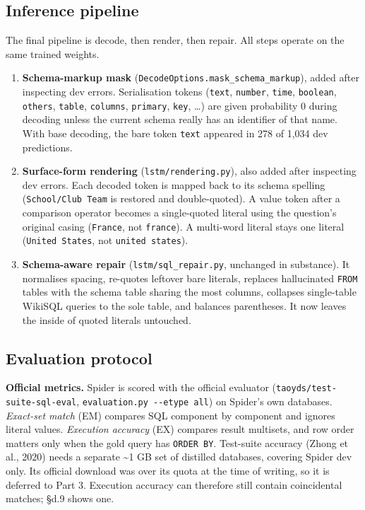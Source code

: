 \documentclass[
  10pt,
]{article}
\providecommand{\tightlist}{%
  \setlength{\itemsep}{0pt}\setlength{\parskip}{0pt}}
\begin{document}
\subsection{Inference pipeline}\label{inference-pipeline}

The final pipeline is decode, then render, then repair. All steps
operate on the same trained weights.

\begin{enumerate}
\def\labelenumi{\arabic{enumi}.}
\tightlist
\item
  \textbf{Schema-markup mask}
  (\texttt{DecodeOptions.mask\_schema\_markup}), added after inspecting
  dev errors. Serialisation tokens (\texttt{text}, \texttt{number},
  \texttt{time}, \texttt{boolean}, \texttt{others}, \texttt{table},
  \texttt{columns}, \texttt{primary}, \texttt{key}, \ldots) are given
  probability 0 during decoding unless the current schema really has an
  identifier of that name. With base decoding, the bare token
  \texttt{text} appeared in 278 of 1,034 dev predictions.
\item
  \textbf{Surface-form rendering} (\texttt{lstm/rendering.py}), also
  added after inspecting dev errors. Each decoded token is mapped back
  to its schema spelling (\texttt{School/Club\ Team} is restored and
  double-quoted). A value token after a comparison operator becomes a
  single-quoted literal using the question's original casing
  (\texttt{\textquotesingle{}France\textquotesingle{}}, not
  \texttt{\textquotesingle{}france\textquotesingle{}}). A multi-word
  literal stays one literal
  (\texttt{\textquotesingle{}United\ States\textquotesingle{}}, not
  \texttt{\textquotesingle{}united\textquotesingle{}\ states}).
\item
  \textbf{Schema-aware repair} (\texttt{lstm/sql\_repair.py}, unchanged
  in substance). It normalises spacing, re-quotes leftover bare
  literals, replaces hallucinated \texttt{FROM} tables with the schema
  table sharing the most columns, collapses single-table WikiSQL queries
  to the sole table, and balances parentheses. It now leaves the inside
  of quoted literals untouched.
\end{enumerate}

\subsection{Evaluation protocol}\label{evaluation-protocol}

\textbf{Official metrics.} Spider is scored with the official evaluator
(\texttt{taoyds/test-suite-sql-eval},
\texttt{evaluation.py\ -\/-etype\ all}) on Spider's own databases.
\emph{Exact-set match} (EM) compares SQL component by component and
ignores literal values. \emph{Execution accuracy} (EX) compares result
multisets, and row order matters only when the gold query has
\texttt{ORDER\ BY}. Test-suite accuracy (Zhong et al., 2020) needs a
separate \textasciitilde1 GB set of distilled databases, covering Spider
dev only. Its official download was over its quota at the time of
writing, so it is deferred to Part 3. Execution accuracy can therefore
still contain coincidental matches; §d.9 shows one.
\end{document}
